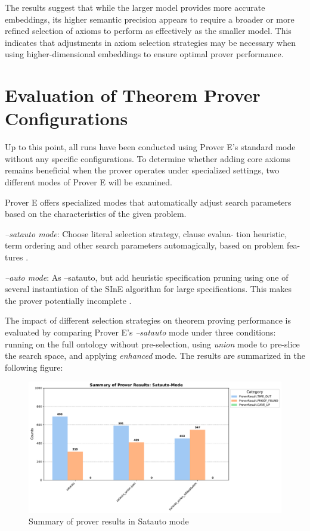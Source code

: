 \documentclass[english,version-2020-11]{uzl-thesis}
\begin{document}
The results suggest that while the larger model provides more accurate embeddings, its higher semantic precision appears to require a broader or more refined selection of axioms to perform as effectively as the smaller model. This indicates that adjustments in axiom selection strategies may be necessary when using higher-dimensional embeddings to ensure optimal prover performance.


\section{Evaluation of Theorem Prover Configurations}

Up to this point, all runs have been conducted using Prover E's standard mode without any specific configurations. To determine whether adding core axioms remains beneficial when the prover operates under specialized settings, two different modes of Prover E will be examined.

Prover E offers specialized modes that automatically adjust search parameters based on the characteristics of the given problem.

\begin{definition}
    \textit{--satauto mode}: Choose literal selection strategy, clause evalua-
    tion heuristic, term ordering and other search
    parameters automagically, based on problem fea-
    tures \cite{schulz2019eprover}.
\end{definition}

\begin{definition}
    \textit{--auto mode}: As --satauto, but add heuristic specification
    pruning using one of several instantiation of the
    SInE algorithm for large specifications.
    This makes the prover potentially incomplete \cite{schulz2019eprover}.
\end{definition}


The impact of different selection strategies on theorem proving performance is evaluated by comparing Prover E's \textit{--satauto} mode under three conditions: running on the full ontology without pre-selection, using \textit{union} mode to pre-slice the search space, and applying \textit{enhanced} mode. The results are summarized in the following figure:

\begin{figure}[h!]
    \centering
    \includegraphics[width=\textwidth]{satauto_mode_output.pdf}
    \caption{Summary of prover results in Satauto mode}
    \label{fig:prover_results_satauto}
\end{figure}
\FloatBarrier
\end{document}
